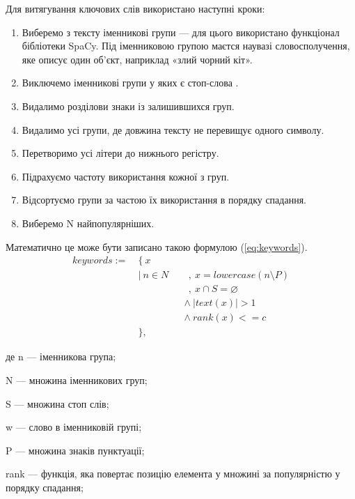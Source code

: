 \documentclass[14pt]{extarticle}
\begin{document}
  Для витягування ключових слів використано наступні кроки:
  \begin{enumerate}[labelindent=\dimexpr\parindent*2\relax, leftmargin=*]
    \item Виберемо з тексту іменникові групи ---
      для цього використано функціонал бібліотеки SpaCy.
      Під іменниковою групою маєтся наувазі словосполучення,
      яке описує один об'єкт, наприклад «злий чорний кіт».
    \item Виключемо іменникові групи у яких є стоп-слова \cite{wiki_stop_word}.
    \item Видалимо розділови знаки із залишившихся груп.
    \item Видалимо усі групи, де довжина тексту не перевищує одного символу.
    \item Перетворимо усі літери до нижнього регістру.
    \item Підрахуємо частоту використання кожної з груп.
    \item Відсортуємо групи за частою їх використання в порядку спадання.
    \item Виберемо N найпопулярніших.
  \end{enumerate}

  Математично це може бути записано такою формулою (\ref{eq:keywords}).
  \begin{equation}
    \begin{alignedat}{2}
     keywords := ~&\{~ x \\
                  &|~ n \in N &&~~,  ~ x = lowercase(n \setminus P) \\
                  &           &&~~,  ~ x \cap S = \varnothing \\
                  &           &&\land~ | text(x) | > 1 \\
                  &           &&\land~ rank(x) <= c \\
                  &\},
    \end{alignedat}
    \label{eq:keywords}
  \end{equation}

  де n --- іменникова група;
  
  N --- множина іменникових груп;
  
  S --- множина стоп слів;
  
  w --- слово в іменниковій групі;
  
  P --- множина знаків пунктуації;
  
  rank --- функція,
      яка повертає позицію елемента у множині за популярністю
      у порядку спадання;
  
\end{document}
